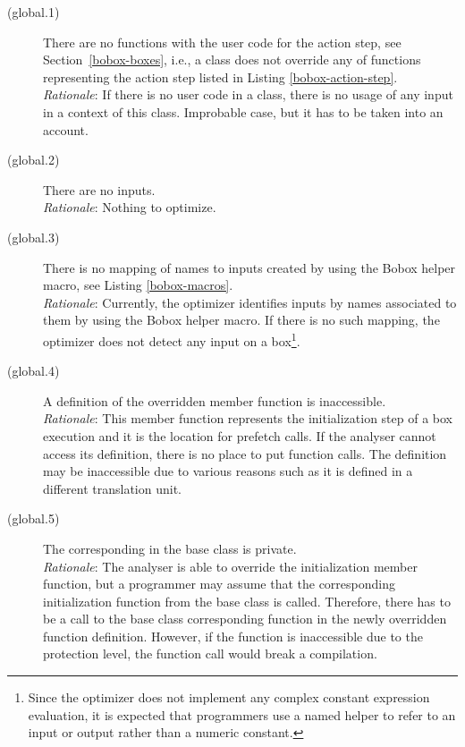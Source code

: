 \begin{description}
\item[(global.1)]{There are no functions with the user code for the action step, see Section~\ref{bobox-boxes}, i.e., a class does not override any of functions representing the action step listed in Listing \ref{bobox-action-step}.\\
\emph{Rationale}: If there is no user code in a class, there is no usage of any input in a context of this class. Improbable case, but it has to be taken into an account.
}

\item[(global.2)]{There are no inputs.\\
\emph{Rationale}: Nothing to optimize. 
}

\item[(global.3)]{There is no mapping of names to inputs created by using the Bobox helper macro, see Listing \ref{bobox-macros}.\\
\emph{Rationale}: Currently, the optimizer identifies inputs by names associated to them by using the Bobox helper macro. If there is no such mapping, the optimizer does not detect any input on a box\footnote{Since the optimizer does not implement any complex constant expression evaluation, it is expected that programmers use a named helper to refer to an input or output rather than a numeric constant.}.
}

\item[(global.4)]{A definition of the overridden  member function is inaccessible.\\
\emph{Rationale}: This member function represents the initialization step of a box execution and it is the location for prefetch calls. If the analyser cannot access its definition, there is no place to put function calls. The definition may be inaccessible due to various reasons such as it is defined in a different translation unit.
}

\item[(global.5)]{The corresponding  in the base class is private.\\
\emph{Rationale}: The analyser is able to override the initialization member function, but a programmer may assume that the corresponding initialization function from the base class is called. Therefore, there has to be a call to the base class corresponding function in the newly overridden function definition. However, if the function is inaccessible due to the protection level, the function call would break a compilation.
}
\end{description}

